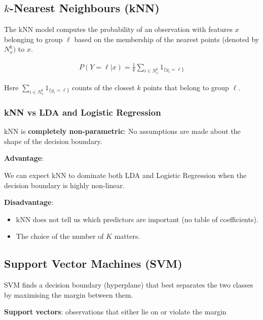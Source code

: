 \subsection{$k$-Nearest Neighbours (kNN)}

\indent 

The kNN model computes the probability of an observation with features $x$ belonging to group $\ell$ based on the membership of the nearest points (denoted by $N_x^k)$ to $x$.

\begin{align*}
    P(Y = \ell|x) = \frac{1}{k}\sum_{i\in N_x^k}1_{\{y_i = \ell\}}
\end{align*}

Here $\sum_{i\in N_x^k}1_{\{y_i = \ell\}}$ counts of the closest $k$ points that belong to group $\ell$.

\subsubsection{kNN vs LDA and Logistic Regression}

\indent 

kNN is \textbf{completely non-parametric}: No assumptions are made about the shape of the decision boundary.

\noindent \textbf{Advantage}:

We can expect kNN to dominate both LDA and Logistic Regression when the decision boundary is highly non-linear.

\bigskip

\noindent\textbf{Disadvantage}:

\begin{itemize}
    \item kNN does not tell us which predictors are important (no table of coefficients).
    \item The choice of the number of $K$ matters.
\end{itemize}

\subsection{Support Vector Machines (SVM)}

\indent 

SVM finds a decision boundary (hyperplane) that best separates the two classes by maximising the margin between them.

\textbf{Support vectors}: observations that either lie on or violate the margin

